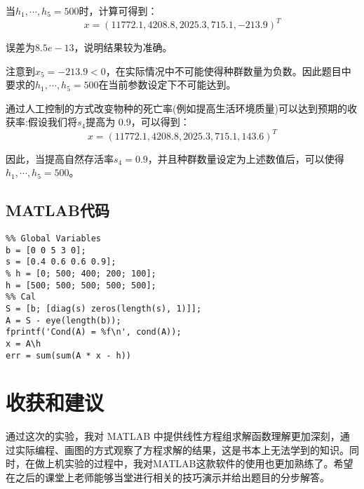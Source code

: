 \documentclass{article}
\begin{document}
当$h_1,\cdots,h_5 = 500$时，计算可得到：
$$x=(11772.1, 4208.8, 2025.3, 715.1, -213.9)^T$$

误差为$8.5e-13$，说明结果较为准确。

注意到$x_5=-213.9<0$，在实际情况中不可能使得种群数量为负数。因此题目中要求的$h_1,\cdots,h_5 = 500$在当前参数设定下不可能达到。

通过人工控制的方式改变物种的死亡率(例如提高生活环境质量)可以达到预期的收获率:假设我们将$s_4$提高为 0.9，可以得到：
$$x=(11772.1, 4208.8, 2025.3, 715.1, 143.6)^T$$

因此，当提高自然存活率$s_4=0.9$，并且种群数量设定为上述数值后，可以使得$h_1,\cdots,h_5 = 500$。

\subsection{MATLAB代码}
\begin{lstlisting}
%% Global Variables
b = [0 0 5 3 0];
s = [0.4 0.6 0.6 0.9];
% h = [0; 500; 400; 200; 100];
h = [500; 500; 500; 500; 500];
%% Cal
S = [b; [diag(s) zeros(length(s), 1)]];
A = S - eye(length(b));
fprintf('Cond(A) = %f\n', cond(A));
x = A\h
err = sum(sum(A * x - h))
\end{lstlisting}

\newpage
\section{收获和建议}
通过这次的实验，我对 MATLAB 中提供线性方程组求解函数理解更加深刻，通过实际编程、画图的方式观察了方程求解的结果，这是书本上无法学到的知识。同时，在做上机实验的过程中，我对MATLAB这款软件的使用也更加熟练了。希望在之后的课堂上老师能够当堂进行相关的技巧演示并给出题目的分步解答。
\end{document}
